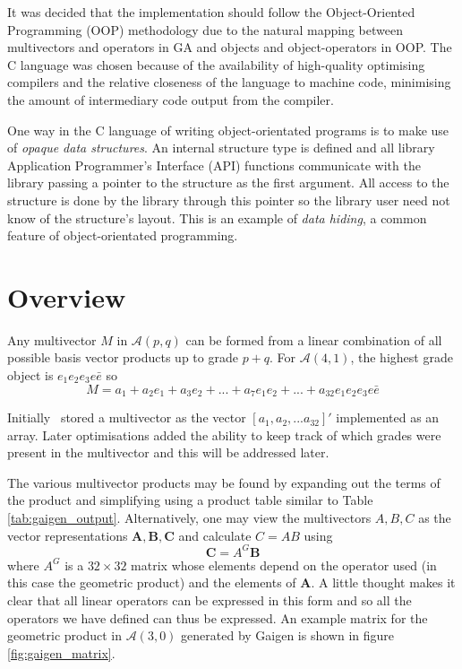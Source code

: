 It was decided that the implementation should follow the 
Object-Oriented Programming (OOP) methodology due to the natural mapping
between multivectors and operators in GA and objects and object-operators
in OOP. The C language was chosen because of the availability of high-quality 
optimising compilers and the relative closeness of the language to machine 
code, minimising the amount of intermediary code output from the compiler.

One way in the C language of writing object-orientated programs is to make
use of \emph{opaque data structures}. An internal structure type is defined
and all library Application Programmer's Interface (API) functions communicate
with the library passing a 
pointer to the structure as the first argument. All access to the
structure is done by the library through this pointer so the library
user need not know of the structure's layout. This is an example
of \emph{data hiding}, a common feature of object-orientated programming.

\section{Overview}


Any multivector $M$ in $\mathcal{A}(p,q)$ can be formed from a linear
combination of all possible basis vector products up to grade $p+q$. For
$\mathcal{A}(4,1)$, the highest grade object is $e_1e_2e_3e\bar{e}$ so \[ M =
a_1 + a_2 e_1 + a_3 e_2 + ... + a_7 e_1e_2 + ... + a_{32} e_1e_2e_3e\bar{e} \]

Initially \libcga\ stored a multivector as the vector $[ a_1, a_2, ...
a_{32} ]'$ implemented as an array. Later optimisations added the ability to
keep track of which grades were present in the multivector and this will be
addressed later.

The various multivector products may be found by expanding out the terms of the
product and simplifying using a product table similar to Table
\ref{tab:gaigen_output}.  Alternatively, one may view the multivectors $A, B,
C$ as the vector representations $\mathbf{A}, \mathbf{B}, \mathbf{C}$ and
calculate $C = AB$ using \[ \mathbf{C} = A^{G} \mathbf{B} \] where $A^G$ is a
$32 \times 32$ matrix whose elements depend on the operator used (in this case
the geometric product) and the elements of $\mathbf{A}$. A little thought makes
it clear that all linear operators can be expressed in this form and so all the
operators we have defined can thus be expressed. An example matrix for the
geometric product in $\mathcal{A}(3,0)$ generated by Gaigen is shown in figure
\ref{fig:gaigen_matrix}.

